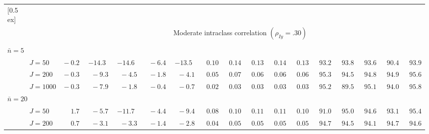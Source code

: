 \begin{sidewaystable}
\begin{threeparttable}
\begin{tabular}{llccccccccccccccc}
[0.5ex]\hline\\[-1.6ex] 
& & \multicolumn{15}{c}{Moderate intraclass correlation $(\rho_{Iy}=.30)$} \\[0.6ex]\hline\\[-1.8ex]
\multicolumn{4}{l}{$\bar{n}=5$} \\  & \nopagebreak $\;J=50$  & $\phantom{0}{-}0.2\phantom{0}$ & ${-}14.3\phantom{0}$ & ${-}14.6\phantom{0}$ & $\phantom{0}{-}6.4\phantom{0}$ & ${-}13.5\phantom{0}$ & $\phantom{0}0.10\phantom{0}$ & $\phantom{0}0.14\phantom{0}$ & $\phantom{0}0.13\phantom{0}$ & $\phantom{0}0.14\phantom{0}$ & $\phantom{0}0.13\phantom{0}$ & $\phantom{0}93.2\phantom{0}$ & $\phantom{0}93.8\phantom{0}$ & $\phantom{0}93.6\phantom{0}$ & $\phantom{0}90.4\phantom{0}$ & $\phantom{0}93.9\phantom{0}$ \\
 & \nopagebreak $\;J=200$  & $\phantom{0}{-}0.3\phantom{0}$ & $\phantom{0}{-}9.3\phantom{0}$ & $\phantom{0}{-}4.5\phantom{0}$ & $\phantom{0}{-}1.8\phantom{0}$ & $\phantom{0}{-}4.1\phantom{0}$ & $\phantom{0}0.05\phantom{0}$ & $\phantom{0}0.07\phantom{0}$ & $\phantom{0}0.06\phantom{0}$ & $\phantom{0}0.06\phantom{0}$ & $\phantom{0}0.06\phantom{0}$ & $\phantom{0}95.3\phantom{0}$ & $\phantom{0}94.5\phantom{0}$ & $\phantom{0}94.8\phantom{0}$ & $\phantom{0}94.9\phantom{0}$ & $\phantom{0}95.6\phantom{0}$ \\
 & \nopagebreak $\;J=1000$  & $\phantom{0}{-}0.3\phantom{0}$ & $\phantom{0}{-}7.9\phantom{0}$ & $\phantom{0}{-}1.8\phantom{0}$ & $\phantom{0}{-}0.4\phantom{0}$ & $\phantom{0}{-}0.7\phantom{0}$ & $\phantom{0}0.02\phantom{0}$ & $\phantom{0}0.03\phantom{0}$ & $\phantom{0}0.03\phantom{0}$ & $\phantom{0}0.03\phantom{0}$ & $\phantom{0}0.03\phantom{0}$ & $\phantom{0}95.2\phantom{0}$ & $\phantom{0}89.5\phantom{0}$ & $\phantom{0}95.1\phantom{0}$ & $\phantom{0}94.0\phantom{0}$ & $\phantom{0}95.8\phantom{0}$ \\
\multicolumn{4}{l}{$\bar{n}=20$} \\  & \nopagebreak $\;J=50$  & $\phantom{0}\phantom{-}1.7\phantom{0}$ & $\phantom{0}{-}5.7\phantom{0}$ & ${-}11.7\phantom{0}$ & $\phantom{0}{-}4.4\phantom{0}$ & $\phantom{0}{-}9.4\phantom{0}$ & $\phantom{0}0.08\phantom{0}$ & $\phantom{0}0.10\phantom{0}$ & $\phantom{0}0.11\phantom{0}$ & $\phantom{0}0.11\phantom{0}$ & $\phantom{0}0.10\phantom{0}$ & $\phantom{0}91.0\phantom{0}$ & $\phantom{0}95.0\phantom{0}$ & $\phantom{0}94.6\phantom{0}$ & $\phantom{0}93.1\phantom{0}$ & $\phantom{0}95.4\phantom{0}$ \\
 & \nopagebreak $\;J=200$  & $\phantom{0}\phantom{-}0.7\phantom{0}$ & $\phantom{0}{-}3.1\phantom{0}$ & $\phantom{0}{-}3.3\phantom{0}$ & $\phantom{0}{-}1.4\phantom{0}$ & $\phantom{0}{-}2.8\phantom{0}$ & $\phantom{0}0.04\phantom{0}$ & $\phantom{0}0.05\phantom{0}$ & $\phantom{0}0.05\phantom{0}$ & $\phantom{0}0.05\phantom{0}$ & $\phantom{0}0.05\phantom{0}$ & $\phantom{0}94.7\phantom{0}$ & $\phantom{0}94.5\phantom{0}$ & $\phantom{0}94.1\phantom{0}$ & $\phantom{0}94.7\phantom{0}$ & $\phantom{0}94.6\phantom{0}$ \\

\end{tabular}
\end{threeparttable}
\end{sidewaystable}
